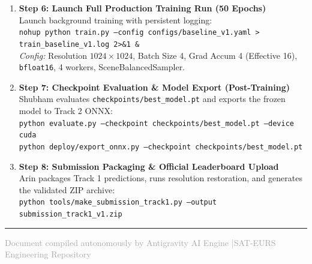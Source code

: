 \documentclass[10pt,a4paper]{article}
\begin{document}
\begin{enumerate}[leftmargin=1.4em,noitemsep,topsep=3pt]
    \item \textbf{Step 6: Launch Full Production Training Run (50 Epochs)}\\
    Launch background training with persistent logging:\\
    \texttt{nohup python train.py --config configs/baseline\_v1.yaml > train\_baseline\_v1.log 2>\&1 \&}\\
    \textit{Config:} Resolution $1024 \times 1024$, Batch Size 4, Grad Accum 4 (Effective 16), \texttt{bfloat16}, 4 workers, SceneBalancedSampler.

    \item \textbf{Step 7: Checkpoint Evaluation \& Model Export (Post-Training)}\\
    Shubham evaluates \texttt{checkpoints/best\_model.pt} and exports the frozen model to Track 2 ONNX:\\
    \texttt{python evaluate.py --checkpoint checkpoints/best\_model.pt --device cuda}\\
    \texttt{python deploy/export\_onnx.py --checkpoint checkpoints/best\_model.pt}

    \item \textbf{Step 8: Submission Packaging \& Official Leaderboard Upload}\\
    Arin packages Track 1 predictions, runs resolution restoration, and generates the validated ZIP archive:\\
    \texttt{python tools/make\_submission\_track1.py --output submission\_track1\_v1.zip}
\end{enumerate}

\vspace{1.5em}
\hrule
\vspace{0.6em}
\begin{center}
    \textcolor{darkgrey}{\footnotesize Document compiled autonomously by Antigravity AI Engine \quad|\quad SAT-EURS Engineering Repository}
\end{center}
\end{document}
